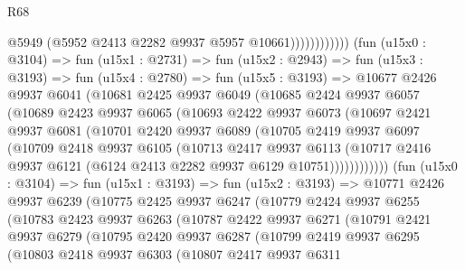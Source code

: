 \begin{lexlean}{R68}
\begin{coremodule}
                              @5949
                              (@5952 @2413 @2282 @9937 @5957 @10661))))))))))))
        (fun (u15x0 : @3104) =>
        fun (u15x1 : @2731) =>
        fun (u15x2 : @2943) =>
        fun (u15x3 : @3193) =>
        fun (u15x4 : @2780) =>
        fun (u15x5 : @3193) =>
        @10677
          @2426
          @9937
          @6041
          (@10681
            @2425
            @9937
            @6049
            (@10685
              @2424
              @9937
              @6057
              (@10689
                @2423
                @9937
                @6065
                (@10693
                  @2422
                  @9937
                  @6073
                  (@10697
                    @2421
                    @9937
                    @6081
                    (@10701
                      @2420
                      @9937
                      @6089
                      (@10705
                        @2419
                        @9937
                        @6097
                        (@10709
                          @2418
                          @9937
                          @6105
                          (@10713
                            @2417
                            @9937
                            @6113
                            (@10717
                              @2416
                              @9937
                              @6121
                              (@6124 @2413 @2282 @9937 @6129 @10751))))))))))))
        (fun (u15x0 : @3104) =>
        fun (u15x1 : @3193) =>
        fun (u15x2 : @3193) =>
        @10771
          @2426
          @9937
          @6239
          (@10775
            @2425
            @9937
            @6247
            (@10779
              @2424
              @9937
              @6255
              (@10783
                @2423
                @9937
                @6263
                (@10787
                  @2422
                  @9937
                  @6271
                  (@10791
                    @2421
                    @9937
                    @6279
                    (@10795
                      @2420
                      @9937
                      @6287
                      (@10799
                        @2419
                        @9937
                        @6295
                        (@10803
                          @2418
                          @9937
                          @6303
                          (@10807
                            @2417
                            @9937
                            @6311

\end{coremodule}
\end{lexlean}
